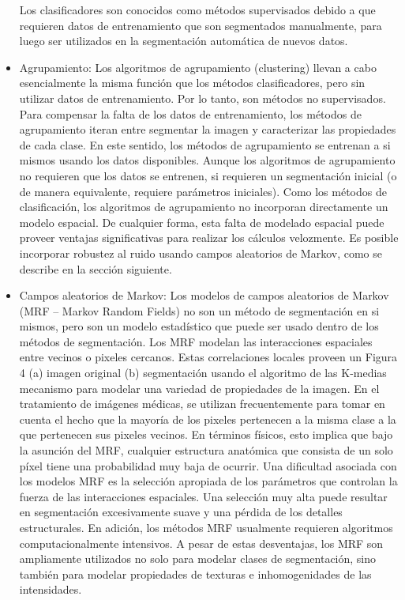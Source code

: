 \begin{itemize}
Los clasificadores son conocidos como m\'etodos supervisados debido a que requieren datos de entrenamiento que son segmentados manualmente, para luego ser utilizados en la segmentaci\'on autom\'atica de nuevos datos.
\item Agrupamiento: Los algoritmos de agrupamiento (clustering) llevan a cabo esencialmente la misma
funci\'on que los m\'etodos clasificadores, pero sin utilizar datos de entrenamiento. Por lo tanto, son m\'etodos no supervisados. Para compensar la falta de los datos de entrenamiento, los m\'etodos de agrupamiento iteran entre segmentar la imagen y caracterizar las propiedades de cada clase. En este sentido, los m\'etodos de agrupamiento se entrenan a si mismos usando los datos disponibles. 
Aunque los algoritmos de agrupamiento no requieren que los datos se entrenen, si requieren un segmentaci\'on inicial (o de manera equivalente, requiere par\'ametros iniciales). Como los m\'etodos de clasificaci\'on, los algoritmos de agrupamiento no incorporan directamente un modelo espacial. De cualquier forma, esta falta de modelado espacial puede proveer ventajas significativas para realizar los c\'alculos velozmente. Es posible incorporar robustez al ruido usando campos aleatorios de Markov, como se describe en la sección siguiente.
\item Campos aleatorios de Markov: Los modelos de campos aleatorios de Markov (MRF – Markov Random Fields) no son un m\'etodo de segmentaci\'on en si mismos, pero son un modelo estad\'istico que puede ser usado dentro de los m\'etodos de segmentaci\'on. Los MRF modelan las interacciones espaciales entre vecinos o pixeles cercanos. Estas correlaciones locales proveen un Figura 4 (a) imagen original (b) segmentaci\'on usando el algoritmo de las K-medias mecanismo para modelar una variedad de propiedades de la imagen. En el tratamiento de im\'agenes m\'edicas, se utilizan frecuentemente para tomar en cuenta el hecho que la mayor\'ia de los pixeles pertenecen a la misma clase a la que pertenecen sus pixeles vecinos. En t\'erminos f\'isicos, esto implica que bajo la asunci\'on del MRF, cualquier estructura anat\'omica que consista de un solo p\'ixel tiene una probabilidad muy baja de ocurrir. Una dificultad asociada con los modelos MRF es la selección apropiada de los par\'ametros que controlan la fuerza de las interacciones espaciales. Una selecci\'on muy alta puede resultar en segmentaci\'on excesivamente suave y una p\'erdida de los detalles estructurales. En adici\'on, los m\'etodos MRF usualmente requieren algoritmos computacionalmente intensivos. A pesar de estas desventajas, los MRF son ampliamente utilizados no solo para modelar clases de segmentaci\'on, sino tambi\'en para modelar propiedades de texturas e inhomogenidades de las intensidades.

\end{itemize}
